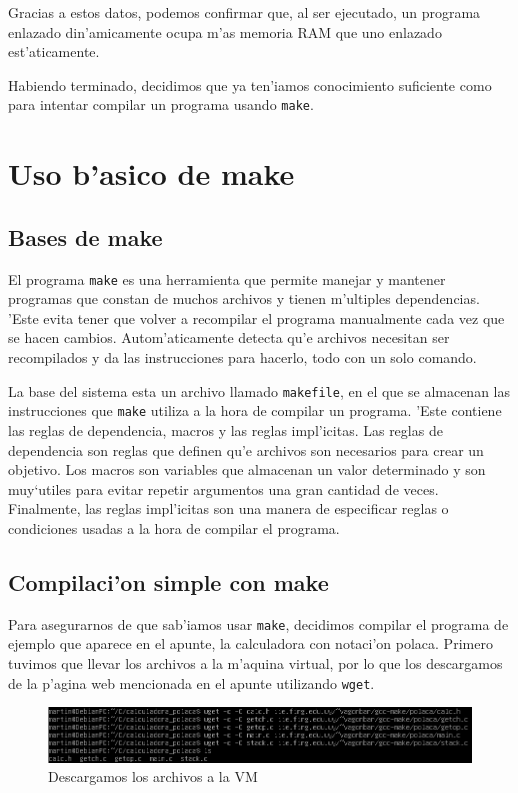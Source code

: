 \documentclass[11pt]{article}
\begin{document}
		Gracias a estos datos, podemos confirmar que, al ser ejecutado, un programa enlazado din'amicamente ocupa m'as memoria RAM que uno enlazado est'aticamente.

		Habiendo terminado, decidimos que ya ten'iamos conocimiento suficiente como para intentar compilar un programa usando \texttt{make}.

		
	\section{Uso b'asico de make}
	\subsection{Bases de make}
		El programa \texttt{make} es una herramienta que permite manejar y mantener programas que constan de muchos archivos y tienen m'ultiples dependencias. 'Este evita tener que volver a recompilar el programa manualmente cada vez que se hacen cambios. Autom'aticamente detecta qu'e archivos necesitan ser recompilados y da las instrucciones para hacerlo, todo con un solo comando.
		
		La base del sistema esta un archivo llamado \texttt{makefile}, en el que se almacenan las instrucciones que \texttt{make} utiliza a la hora de compilar un programa. 'Este contiene las reglas de dependencia, macros y las reglas impl'icitas. Las reglas de dependencia son reglas que definen qu'e archivos son necesarios para crear un objetivo\footnotemark. Los macros son variables que almacenan un valor determinado y son muy`utiles para evitar repetir argumentos una gran cantidad de veces. Finalmente, las reglas impl'icitas son una manera de especificar reglas o condiciones usadas a la hora de compilar el programa.
		

	\subsection{Compilaci'on simple con make}
		Para asegurarnos de que sab'iamos usar \texttt{make}, decidimos compilar el programa de ejemplo que aparece en el apunte, la calculadora con notaci'on polaca. Primero tuvimos que llevar los archivos a la m'aquina virtual, por lo que los descargamos de la p'agina web mencionada en el apunte utilizando \texttt{wget}.
		
		\begin{figure}[H]
				\centering
				\includegraphics[width=.9\linewidth]{Images/Seccion 2/S2.PNG}
				\caption{Descargamos los archivos a la VM}
				\label{fig:makefile-download}
		\end{figure}
		
\end{document}
